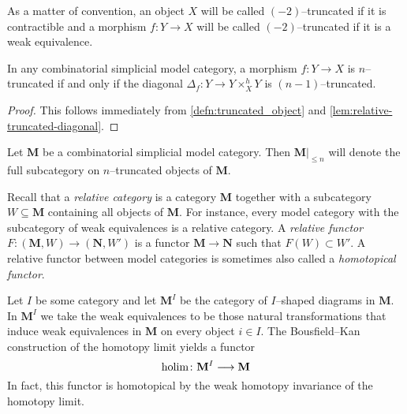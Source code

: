 As a matter of convention, an object \(X\) will be called
\((-2)\)--truncated if it is contractible and a morphism \(f\colon
Y\to X\) will be called \((-2)\)--truncated if it is a weak
equivalence.

\begin{corollary}\label{cor:general-diagonal-truncated}
  In any combinatorial simplicial model category, a morphism \(f\colon
  Y\to X\) is \(n\)--truncated if and only if the diagonal
  \(\Delta_{f}\colon Y\to Y\times^{h}_{X} Y\) is
  \((n-1)\)--truncated.
\end{corollary}
\begin{proof}
  This follows immediately from \autoref{defn:truncated_object} and
  \autoref{lem:relative-truncated-diagonal}.
\end{proof}

\begin{definition}
  Let \(\mathbf{M}\) be a combinatorial simplicial model
  category. Then \(\mathbf{M}|_{{\leq}n}\) will denote the full
  subcategory on \(n\)--truncated objects of \(\mathbf{M}\).
\end{definition}

Recall that a \emph{relative category} is a category \(\mathbf{M}\)
together with a subcategory \(W\subseteq \mathbf{M}\) containing all
objects of \(\mathbf{M}\). For instance, every model category with the
subcategory of weak equivalences is a relative category. A
\emph{relative functor} \(F\colon (\mathbf{M},W) \to (\mathbf{N},W')\)
is a functor \(\mathbf{M}\to\mathbf{N}\) such that \(F(W)\subset
W'\). A relative functor between model categories is sometimes also
called a \emph{homotopical functor}.

\begin{remark}\label{rem:holim-homotopical}
  Let \(I\) be some category and let \(\mathbf{M}^{I}\) be the
  category of \(I\)--shaped diagrams in \(\mathbf{M}\). In
  \(\mathbf{M}^{I}\) we take the weak equivalences to be those natural
  transformations that induce weak equivalences in \(\mathbf{M}\) on
  every object \(i\in I\). The Bousfield--Kan construction of the
  homotopy limit yields a functor
\[
\operatorname*{\textnormal{holim}}\colon \mathbf{M}^I \longrightarrow \mathbf{M}
\]
  In fact, this functor is homotopical by the weak homotopy invariance
  of the homotopy limit.
\end{remark}

